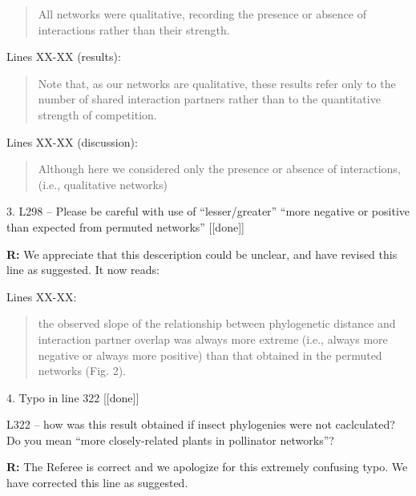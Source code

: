 \documentclass[12pt]{letter}
\newenvironment{refquote}{\bigskip \begin{it}}{\end{it}\smallskip}
\begin{document}
		\begin{quotation}

			All networks were qualitative, recording the presence or 
		    absence of interactions rather than their strength.

		\end{quotation}


		Lines XX-XX (results):
		
		\begin{quotation}

			Note that, as our networks 
		    are qualitative, these results refer only to the number of shared interaction
	    	partners rather than to the quantitative strength of competition.

    	\end{quotation}


    	Lines XX-XX (discussion):

    	\begin{quotation}

		  Although here we considered only the presence or absence of interactions,
		  (i.e., qualitative networks)

    	\end{quotation}


	3. L298 – Please be careful with use of “lesser/greater” “more negative or positive than expected from permuted networks” [[done]]

		\textbf{R:} We appreciate that this desceription could be unclear, and have revised this line as suggested. It now reads:

		Lines XX-XX:

		\begin{quotation}

			the observed 
		    slope of the relationship between phylogenetic distance and interaction 
		    partner overlap was always more extreme (i.e., always more negative or 
		    always more positive) than that obtained in the permuted networks (Fig. 2).

	    \end{quotation}


	4. Typo in line 322 [[done]]
		
		\begin{refquote}
			L322 – how was this result obtained if insect phylogenies were not caclculated? Do you mean “more closely-related plants in pollinator networks”?
		\end{refquote}


		\textbf{R:} The Referee is correct and we apologize for this extremely confusing typo. We have corrected this line as suggested.
\end{document}
